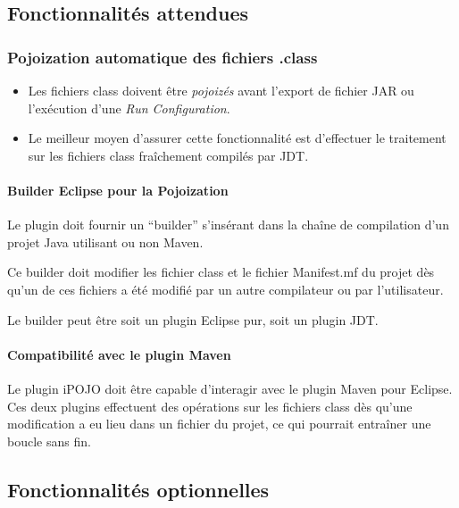 \documentclass[letterpaper,10pt,french]{sphinxmanual}
\begin{document}
\subsection{Fonctionnalités attendues}
\label{developer/index:fonctionnalites-attendues}

\subsubsection{Pojoization automatique des fichiers .class}
\label{developer/index:pojoization-automatique-des-fichiers-class}\begin{itemize}
\item {} 
Les fichiers class doivent être \emph{pojoizés} avant l'export de fichier JAR
ou l'exécution d'une \emph{Run Configuration}.

\item {} 
Le meilleur moyen d'assurer cette fonctionnalité est d'effectuer le
traitement sur les fichiers class fraîchement compilés par JDT.

\end{itemize}


\paragraph{Builder Eclipse pour la Pojoization}
\label{developer/index:builder-eclipse-pour-la-pojoization}
Le plugin doit fournir un ``builder'' s'insérant dans la chaîne de compilation
d'un projet Java utilisant ou non Maven.

Ce builder doit modifier les fichier class et le fichier Manifest.mf du projet
dès qu'un de ces fichiers a été modifié par un autre compilateur ou par
l'utilisateur.

Le builder peut être soit un plugin Eclipse pur, soit un plugin JDT.


\paragraph{Compatibilité avec le plugin Maven}
\label{developer/index:compatibilite-avec-le-plugin-maven}
Le plugin iPOJO doit être capable d'interagir avec le plugin Maven pour Eclipse.
Ces deux plugins effectuent des opérations sur les fichiers class dès qu'une
modification a eu lieu dans un fichier du projet, ce qui pourrait entraîner une
boucle sans fin.


\subsection{Fonctionnalités optionnelles}
\label{developer/index:fonctionnalites-optionnelles}
\end{document}
